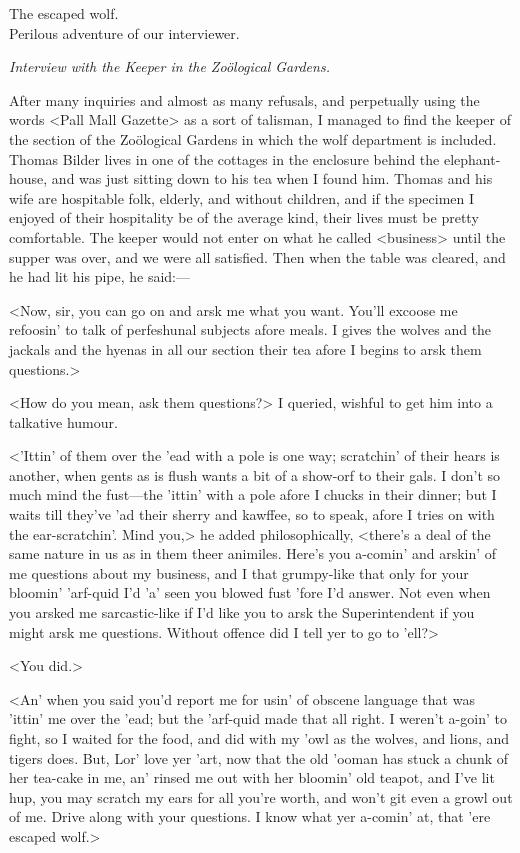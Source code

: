 \begin{newspaper}{The escaped wolf.\\Perilous adventure of our interviewer.}

\textit{Interview with the Keeper in the Zoölogical Gardens.}

After many inquiries and almost as many refusals, and perpetually using the words <Pall Mall Gazette> as a sort of talisman, I managed to find the keeper of the section of the Zoölogical Gardens in which the wolf department is included. Thomas Bilder lives in one of the cottages in the enclosure behind the elephant-house, and was just sitting down to his tea when I found him. Thomas and his wife are hospitable folk, elderly, and without children, and if the specimen I enjoyed of their hospitality be of the average kind, their lives must be pretty comfortable. The keeper would not enter on what he called <business> until the supper was over, and we were all satisfied. Then when the table was cleared, and he had lit his pipe, he said:—

<Now, sir, you can go on and arsk me what you want. You'll excoose me refoosin' to talk of perfeshunal subjects afore meals. I gives the wolves and the jackals and the hyenas in all our section their tea afore I begins to arsk them questions.>

<How do you mean, ask them questions?> I queried, wishful to get him into a talkative humour.

<'Ittin' of them over the 'ead with a pole is one way; scratchin' of their hears is another, when gents as is flush wants a bit of a show-orf to their gals. I don't so much mind the fust—the 'ittin' with a pole afore I chucks in their dinner; but I waits till they've 'ad their sherry and kawffee, so to speak, afore I tries on with the ear-scratchin'. Mind you,> he added philosophically, <there's a deal of the same nature in us as in them theer animiles. Here's you a-comin' and arskin' of me questions about my business, and I that grumpy-like that only for your bloomin' 'arf-quid I'd 'a' seen you blowed fust 'fore I'd answer. Not even when you arsked me sarcastic-like if I'd like you to arsk the Superintendent if you might arsk me questions. Without offence did I tell yer to go to 'ell?>

<You did.>

<An' when you said you'd report me for usin' of obscene language that was 'ittin' me over the 'ead; but the 'arf-quid made that all right. I weren't a-goin' to fight, so I waited for the food, and did with my 'owl as the wolves, and lions, and tigers does. But, Lor' love yer 'art, now that the old 'ooman has stuck a chunk of her tea-cake in me, an' rinsed me out with her bloomin' old teapot, and I've lit hup, you may scratch my ears for all you're worth, and won't git even a growl out of me. Drive along with your questions. I know what yer a-comin' at, that 'ere escaped wolf.>


\end{newspaper}

